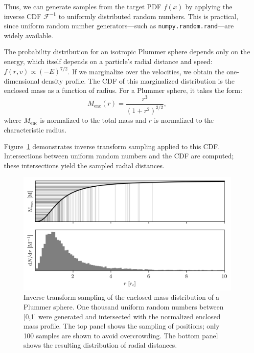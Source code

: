             Thus, we can generate samples from the target PDF $f(x)$ by applying the inverse CDF $\mathcal{F}^{-1}$ to uniformly distributed random numbers. This is practical, since uniform random number generators—such as \texttt{numpy.random.rand}—are widely available.

            The probability distribution for an isotropic Plummer sphere depends only on the energy, which itself depends on a particle’s radial distance and speed: $f(r,v) \propto (-E)^{7/2}$. If we marginalize over the velocities, we obtain the one-dimensional density profile. The CDF of this marginalized distribution is the enclosed mass as a function of radius. For a Plummer sphere, it takes the form:
            \begin{equation}
                M_{\mathrm{enc}}(r) = \frac{r^3}{\left(1 + r^2\right)^{3/2}},
            \end{equation}
            where $M_{\mathrm{enc}}$ is normalized to the total mass and $r$ is normalized to the characteristic radius.

            Figure~\ref{fig:inverse_transform_sampling_distances} demonstrates inverse transform sampling applied to this CDF. Intersections between uniform random numbers and the CDF are computed; these intersections yield the sampled radial distances.

            \begin{figure}
                \includegraphics[width=\linewidth]{images/inverse_transform_sampling_distances.png}
                \caption{Inverse transform sampling of the enclosed mass distribution of a Plummer sphere. One thousand uniform random numbers between [0,1] were generated and intersected with the normalized enclosed mass profile. The top panel shows the sampling of positions; only 100 samples are shown to avoid overcrowding. The bottom panel shows the resulting distribution of radial distances.}
                \label{fig:inverse_transform_sampling_distances}
            \end{figure}

